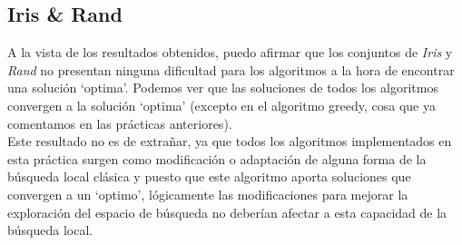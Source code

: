 \subsection{Iris \& Rand}
A la vista de los resultados obtenidos, puedo afirmar que los conjuntos de \emph{Iris} y \emph{Rand} no presentan ninguna dificultad para los algoritmos a la hora de encontrar una solución `optima'. Podemos ver que las soluciones de todos los algoritmos convergen a la solución `optima' (excepto en el algoritmo greedy, cosa que ya comentamos en las prácticas anteriores).\\
Este resultado no es de extrañar, ya que todos los algoritmos implementados en esta práctica surgen como modificación o adaptación de alguna forma de la búsqueda local clásica y puesto que este algoritmo aporta soluciones que convergen a un `optimo', lógicamente las modificaciones para mejorar la exploración del espacio de búsqueda no deberían afectar a esta capacidad de la búsqueda local.


